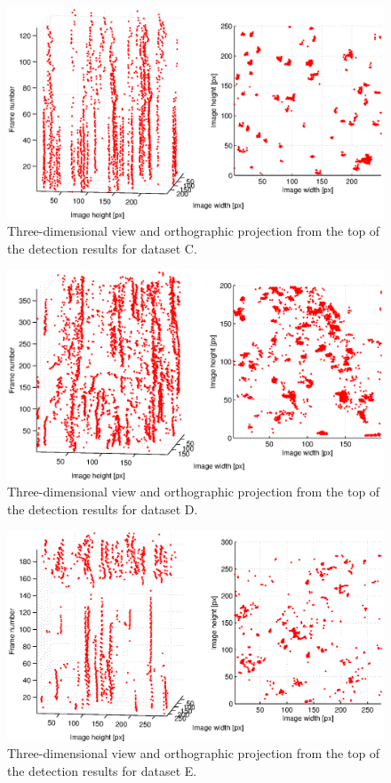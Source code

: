 	\begin{figure}[h]
		\includegraphics[width=\textwidth]{images/fig_results_detector_sequences_3}
		\caption{Three-dimensional view and orthographic projection from the top of the detection results for dataset C.}
		\label{fig:results_detector_sequences_3}
	\end{figure}
	
	\begin{figure}[h]
		\includegraphics[width=\textwidth]{images/fig_results_detector_sequences_4}
		\caption{Three-dimensional view and orthographic projection from the top of the detection results for dataset D.}
		\label{fig:results_detector_sequences_4}
	\end{figure}
	
	\begin{figure}[h]
		\includegraphics[width=\textwidth]{images/fig_results_detector_sequences_5}
		\caption{Three-dimensional view and orthographic projection from the top of the detection results for dataset E.}
		\label{fig:results_detector_sequences_5}
	\end{figure}			